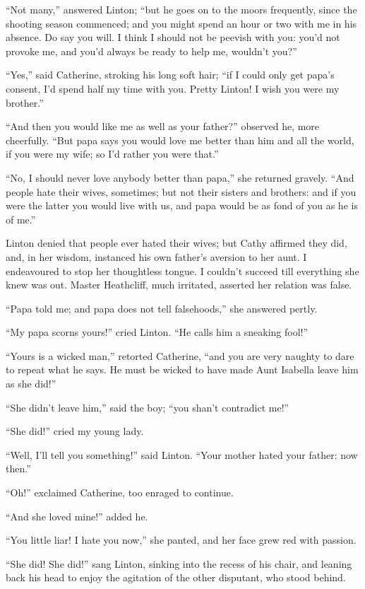 \par “Not many,” answered Linton; “but he goes on to the moors frequently, since the shooting season commenced; and you might spend an hour or two with me in his absence. Do say you will. I think I should not be peevish with you: you'd not provoke me, and you'd always be ready to help me, wouldn't you?”
\par “Yes,” said Catherine, stroking his long soft hair; “if I could only get papa's consent, I'd spend half my time with you. Pretty Linton! I wish you were my brother.”
\par “And then you would like me as well as your father?” observed he, more cheerfully. “But papa says you would love me better than him and all the world, if you were my wife; so I'd rather you were that.”
\par “No, I should never love anybody better than papa,” she returned gravely. “And people hate their wives, sometimes; but not their sisters and brothers: and if you were the latter you would live with us, and papa would be as fond of you as he is of me.”
\par Linton denied that people ever hated their wives; but Cathy affirmed they did, and, in her wisdom, instanced his own father's aversion to her aunt. I endeavoured to stop her thoughtless tongue. I couldn't succeed till everything she knew was out. Master Heathcliff, much irritated, asserted her relation was false.
\par “Papa told me; and papa does not tell falsehoods,” she answered pertly.
\par “My papa scorns yours!” cried Linton. “He calls him a sneaking fool!”
\par “Yours is a wicked man,” retorted Catherine, “and you are very naughty to dare to repeat what he says. He must be wicked to have made Aunt Isabella leave him as she did!”
\par “She didn't leave him,” said the boy; “you shan't contradict me!”
\par “She did!” cried my young lady.
\par “Well, I'll tell you something!” said Linton. “Your mother hated your father: now then.”
\par “Oh!” exclaimed Catherine, too enraged to continue.
\par “And she loved mine!” added he.
\par “You little liar! I hate you now,” she panted, and her face grew red with passion.
\par “She did! She did!” sang Linton, sinking into the recess of his chair, and leaning back his head to enjoy the agitation of the other disputant, who stood behind.
